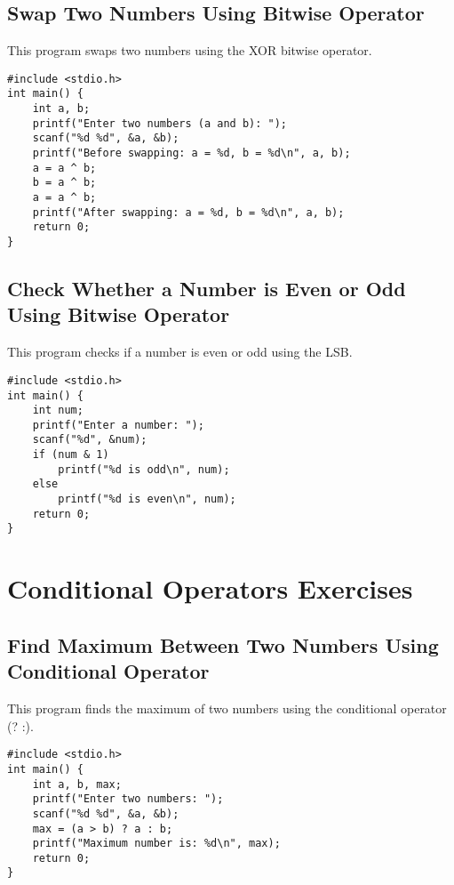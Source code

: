 \documentclass[a4paper,12pt]{article}
\begin{document}
\newpage

\subsection{Swap Two Numbers Using Bitwise Operator}
This program swaps two numbers using the XOR bitwise operator.

\begin{lstlisting}[caption={Swap Two Numbers Using Bitwise Operator}]
#include <stdio.h>
int main() {
    int a, b;
    printf("Enter two numbers (a and b): ");
    scanf("%d %d", &a, &b);
    printf("Before swapping: a = %d, b = %d\n", a, b);
    a = a ^ b;
    b = a ^ b;
    a = a ^ b;
    printf("After swapping: a = %d, b = %d\n", a, b);
    return 0;
}
\end{lstlisting}

\newpage

\subsection{Check Whether a Number is Even or Odd Using Bitwise Operator}
This program checks if a number is even or odd using the LSB.

\begin{lstlisting}[caption={Check Whether a Number is Even or Odd Using Bitwise Operator}]
#include <stdio.h>
int main() {
    int num;
    printf("Enter a number: ");
    scanf("%d", &num);
    if (num & 1)
        printf("%d is odd\n", num);
    else
        printf("%d is even\n", num);
    return 0;
}
\end{lstlisting}

\newpage

\section{Conditional Operators Exercises}

\subsection{Find Maximum Between Two Numbers Using Conditional Operator}
This program finds the maximum of two numbers using the conditional operator (? :).

\begin{lstlisting}[caption={Find Maximum Between Two Numbers Using Conditional Operator}]
#include <stdio.h>
int main() {
    int a, b, max;
    printf("Enter two numbers: ");
    scanf("%d %d", &a, &b);
    max = (a > b) ? a : b;
    printf("Maximum number is: %d\n", max);
    return 0;
}
\end{lstlisting}
\end{document}
